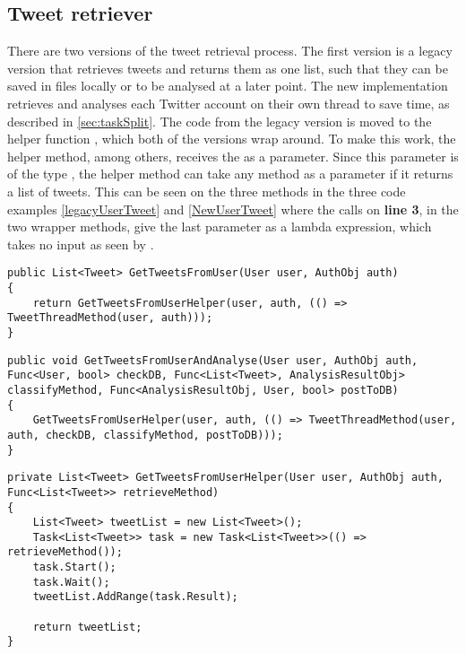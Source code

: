 \subsection{Tweet retriever} \label{sub:tweetretriever}
There are two versions of the tweet retrieval process. The first version
is a legacy version that retrieves tweets and returns them as one list, such
that they can be saved in files locally or to be analysed at a later point.
The new implementation retrieves and analyses each Twitter account on their own
thread to save time, as described in \autoref{sec:taskSplit}. The code from the
legacy version is moved to the helper function ,
which both of the versions wrap around. To make this work, the helper method,
among others, receives the  as a parameter. Since this
parameter is of the type , the helper method can take
any method as a parameter if it returns a list of tweets. This can be
seen on the three methods in the three code examples \autoref{legacyUserTweet}
and \autoref{NewUserTweet} where the calls on \textbf{line 3}, in the two
wrapper methods, give the last parameter as a lambda expression, which takes no
input as seen by \textc{()=>}.\\

\begin{minipage}[H]{\linewidth}
\begin{lstlisting}[caption = Legacy method call. , label = legacyUserTweet ] 
public List<Tweet> GetTweetsFromUser(User user, AuthObj auth)
{	
    return GetTweetsFromUserHelper(user, auth, (() => TweetThreadMethod(user, auth)));
}
\end{lstlisting}
\end{minipage}

\begin{minipage}[H]{\linewidth}
\begin{lstlisting}[caption = Current method call to speed up execution. , label
= NewUserTweet ] 
public void GetTweetsFromUserAndAnalyse(User user, AuthObj auth, Func<User, bool> checkDB, Func<List<Tweet>, AnalysisResultObj> classifyMethod, Func<AnalysisResultObj, User, bool> postToDB)
{
    GetTweetsFromUserHelper(user, auth, (() => TweetThreadMethod(user, auth, checkDB, classifyMethod, postToDB)));
}
\end{lstlisting}
\end{minipage}

\begin{minipage}[H]{\linewidth}
\begin{lstlisting}[caption = The \textc{GetTweetsFromUserHelper} method., label
= UserTweetHelper]
private List<Tweet> GetTweetsFromUserHelper(User user, AuthObj auth, Func<List<Tweet>> retrieveMethod)
{
    List<Tweet> tweetList = new List<Tweet>();
    Task<List<Tweet>> task = new Task<List<Tweet>>(() => retrieveMethod());
    task.Start();
    task.Wait();
    tweetList.AddRange(task.Result);

    return tweetList;
}
\end{lstlisting}
\end{minipage}

